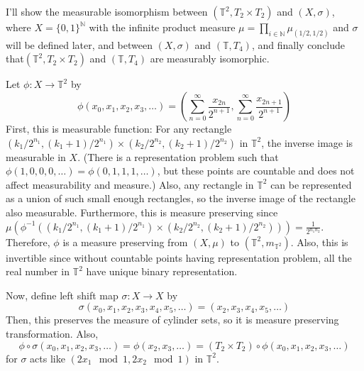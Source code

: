 \documentclass[12pt]{article}
\newenvironment{problem}[2][Problem]{\begin{trivlist}
\item[\hskip \labelsep {\bfseries #1}\hskip \labelsep {\bfseries #2.}]}{\end{trivlist}}
\begin{document}
\begin{problem}{3}
\end{problem}
I'll show the measurable isomorphism between $(\mathbb{T}^2, T_2\times T_2)$ and $(X, \sigma)$, where $X=\{0,1\}^{\mathbb{N}}$ with the infinite product measure $\mu=\prod_{i\in \mathbb{N}}\mu_{(1/2, 1/2)}$ and $\sigma$ will be defined later, and between $(X, \sigma)$ and $(\mathbb{T}, T_4)$, and finally conclude that$(\mathbb{T}^2, T_2\times T_2)$ and $(\mathbb{T}, T_4)$ are measurably isomorphic.

Let $\phi:X\rightarrow \mathbb{T}^2$ by
\begin{equation*}
    \phi(x_0, x_1, x_2, x_3, \ldots)=\left(\sum\limits_{n=0}^\infty \frac{x_{2n}}{2^{n+1}}, \sum\limits_{n=0}^\infty \frac{x_{2n+1}}{2^{n+1}}\right)
\end{equation*}
First, this is measurable function: For any rectangle $(k_1/2^{n_1}, (k_1+1)/2^{n_1})\times (k_2/2^{n_2}, (k_2+1)/2^{n_2})$ in $\mathbb{T}^2$, the inverse image is measurable in $X$. (There is a representation problem such that $\phi(1,0,0, 0, \ldots)=\phi(0, 1, 1, 1, \ldots)$, but these points are countable and does not affect measurability and measure.) Also, any rectangle in $\mathbb{T}^2$ can be represented as a union of such small enough rectangles, so the inverse image of the rectangle also measurable. Furthermore, this is measure preserving since $\mu\left(\phi^{-1}\left((k_1/2^{n_1}, (k_1+1)/2^{n_1})\times (k_2/2^{n_2}, (k_2+1)/2^{n_2})\right)\right)=\frac{1}{2^{n_1n_2}}$. Therefore, $\phi$ is a measure preserving from $(X,\mu)$ to $(\mathbb{T}^2, m_{\mathbb{T}^2})$. Also, this is invertible since without countable points having representation problem, all the real number in $\mathbb{T}^2$ have unique binary representation.

Now, define left shift map $\sigma:X\rightarrow X$ by
\begin{equation*}
    \sigma(x_0, x_1, x_2, x_3, x_4, x_5, \ldots)=(x_2, x_3, x_4, x_5, \ldots)
\end{equation*}
Then, this preserves the measure of cylinder sets, so it is measure preserving transformation. Also,
\begin{equation*}
    \phi\circ \sigma(x_0, x_1, x_2, x_3, \ldots)=\phi(x_2, x_3, \ldots)=(T_2\times T_2)\circ \phi(x_0, x_1, x_2, x_3, \ldots)
\end{equation*}
for $\sigma$ acts like $(2x_1\mod 1, 2x_2\mod 1)$ in $\mathbb{T}^2$.
\end{document}
